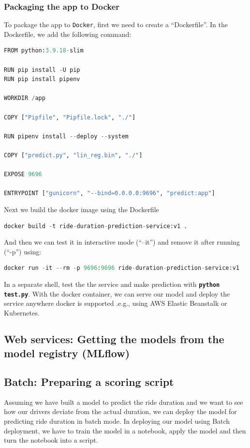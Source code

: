 \documentclass[letterpaper,12pt,notitlepage,twoside]{report}
\begin{document}
\subsubsection{Packaging the app to Docker}
To package the app to \texttt{Docker}, first we need to create a ``Dockerfile''. In the Dockerfile, we add the following command:
\begin{lstlisting}[language=python, numbers=none]
FROM python:3.9.18-slim

RUN pip install -U pip
RUN pip install pipenv

WORKDIR /app  

COPY ["Pipfile", "Pipfile.lock", "./"]

RUN pipenv install --deploy --system

COPY ["predict.py", "lin_reg.bin", "./"]

EXPOSE 9696

ENTRYPOINT ["gunicorn", "--bind=0.0.0.0:9696", "predict:app"]
\end{lstlisting}

Next we build the docker image using the Dockerfile
\begin{lstlisting}[language=python, numbers=none]
docker build -t ride-duration-prediction-service:v1 .
\end{lstlisting}

And then we can test it in interactive mode (``--it'') and remove it after running (``-p'') using:
\begin{lstlisting}[language=python, numbers=none]
docker run -it --rm -p 9696:9696 ride-duration-prediction-service:v1 
\end{lstlisting}

In a separate shell, test the the service and make prediction with \textbf{\texttt{python test.py}}. With the docker container, we can serve our model and deploy the service anywhere docker is supported .e.g., using AWS Elastic Beanstalk or Kubernetes.

\subsection{Web services: Getting the models from the model registry (MLflow)}

\subsection{Batch: Preparing a scoring script}
Assuming we have built a model to predict the ride duration and we want to see how our drivers deviate from the actual duration, we can deploy the model for predicting ride duration in batch mode. In deploying our model using Batch deployment, we have to train the model in a notebook, apply the model and then turn the notebook into a script.
\end{document}
